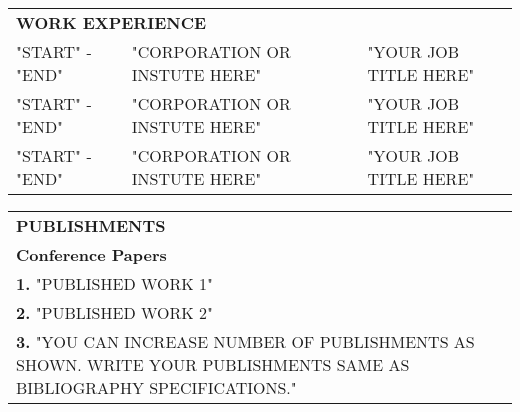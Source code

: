 \documentclass[12pt]{report}
\begin{document}
\begin{table}[!ht]
\begin{tabular}{l p{9.5cm} l}
\multicolumn{3}{l}{\bfseries{WORK EXPERIENCE}}\\[2ex]
"START" - "END" & "CORPORATION OR INSTUTE HERE" & "YOUR JOB TITLE HERE" \\[2ex]
"START" - "END" & "CORPORATION OR INSTUTE HERE" & "YOUR JOB TITLE HERE" \\[2ex]
"START" - "END" & "CORPORATION OR INSTUTE HERE" & "YOUR JOB TITLE HERE" \\[5ex]
\end{tabular}
\begin{tabular}{p{15.5cm}}

\bfseries{PUBLISHMENTS} \\[2ex]
\bfseries{Conference Papers} \\[2ex]
\textbf{1.} "PUBLISHED WORK 1"\\[2ex]
\textbf{2.} "PUBLISHED WORK 2"\\[2ex]
\textbf{3.} "YOU CAN INCREASE NUMBER OF PUBLISHMENTS AS SHOWN. WRITE YOUR PUBLISHMENTS SAME AS BIBLIOGRAPHY SPECIFICATIONS."\\[5ex]
\end{tabular}
\end{table}
\end{document}
